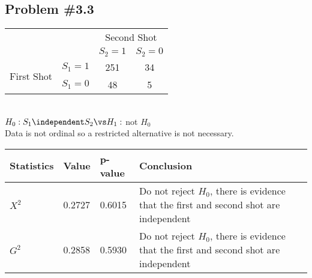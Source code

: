 \documentclass[12pt, letterpaper]{article}
\begin{document}
\subsection*{Problem {\#}3.3}  

\begin{wraptable}{l}{3in} 
\vspace{-12pt} 
\begin{tabular}{c l cc }
							&			& \multicolumn{2}{c}{Second Shot} \\
							&			& $S_2 = 1$	& $S_2 = 0$ 	\\ \cline{3-4} 
\multirow{2}{*}{First Shot} & $S_1 = 1$	& \multicolumn{1}{|c}{251}		& \multicolumn{1}{|c|}{34}\\ \cline{3-4} 
							& $S_1 = 0$ 	& \multicolumn{1}{|c}{48}		& \multicolumn{1}{|c|}{5} \\ \cline{3-4}
\end{tabular}
\vspace{-60pt} 
\end{wraptable} 

\quad \\[12pt]
$H_0: S_1 \independent S_2 \vs H_1:$ not $H_0$  
\\[36pt]
Data is not ordinal so a restricted alternative is not necessary.  

\begin{tabu}{X[l, 1] X[l, 1] X[l, 1] X[l, 4]}
\textbf{Statistics} & \textbf{Value} & \textbf{p-value} & \textbf{Conclusion} \\ \hline 
$X^2$ & 0.2727 & 0.6015 & Do not reject $H_0$, there is evidence that the first and second shot are independent \\ \hline
$G^2$ & 0.2858 & 0.5930 & Do not reject $H_0$, there is evidence that the first and second shot are independent \\ \hline 
\end{tabu}
\end{document}
